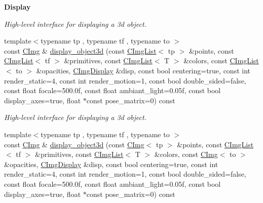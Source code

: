 \begin{Indent}{\bf Display}
\begin{DoxyCompactItemize}
\begin{DoxyCompactList}\small\item\em High-\/level interface for displaying a 3d object. \item\end{DoxyCompactList}\item 
\hypertarget{structcimg__library_1_1_c_img_a36febd630fe1380fbaf68b979eeab45b}{
{\footnotesize template$<$typename tp , typename tf , typename to $>$ }\\const \hyperlink{structcimg__library_1_1_c_img}{CImg} \& \hyperlink{structcimg__library_1_1_c_img_a36febd630fe1380fbaf68b979eeab45b}{display\_\-object3d} (const \hyperlink{structcimg__library_1_1_c_img_list}{CImgList}$<$ tp $>$ \&points, const \hyperlink{structcimg__library_1_1_c_img_list}{CImgList}$<$ tf $>$ \&primitives, const \hyperlink{structcimg__library_1_1_c_img_list}{CImgList}$<$ T $>$ \&colors, const \hyperlink{structcimg__library_1_1_c_img_list}{CImgList}$<$ to $>$ \&opacities, \hyperlink{structcimg__library_1_1_c_img_display}{CImgDisplay} \&disp, const bool centering=true, const int render\_\-static=4, const int render\_\-motion=1, const bool double\_\-sided=false, const float focale=500.0f, const float ambiant\_\-light=0.05f, const bool display\_\-axes=true, float $\ast$const pose\_\-matrix=0) const }
\label{structcimg__library_1_1_c_img_a36febd630fe1380fbaf68b979eeab45b}

\begin{DoxyCompactList}\small\item\em High-\/level interface for displaying a 3d object. \item\end{DoxyCompactList}\item 
\hypertarget{structcimg__library_1_1_c_img_a664dcda0cf9bef788c86a16d23cfddb1}{
{\footnotesize template$<$typename tp , typename tf , typename to $>$ }\\const \hyperlink{structcimg__library_1_1_c_img}{CImg} \& \hyperlink{structcimg__library_1_1_c_img_a664dcda0cf9bef788c86a16d23cfddb1}{display\_\-object3d} (const \hyperlink{structcimg__library_1_1_c_img}{CImg}$<$ tp $>$ \&points, const \hyperlink{structcimg__library_1_1_c_img_list}{CImgList}$<$ tf $>$ \&primitives, const \hyperlink{structcimg__library_1_1_c_img_list}{CImgList}$<$ T $>$ \&colors, const \hyperlink{structcimg__library_1_1_c_img}{CImg}$<$ to $>$ \&opacities, \hyperlink{structcimg__library_1_1_c_img_display}{CImgDisplay} \&disp, const bool centering=true, const int render\_\-static=4, const int render\_\-motion=1, const bool double\_\-sided=false, const float focale=500.0f, const float ambiant\_\-light=0.05f, const bool display\_\-axes=true, float $\ast$const pose\_\-matrix=0) const }
\label{structcimg__library_1_1_c_img_a664dcda0cf9bef788c86a16d23cfddb1}


\end{DoxyCompactItemize}
\end{Indent}
